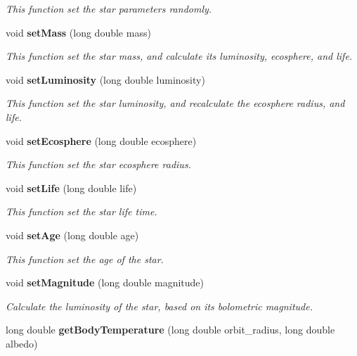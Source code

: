 \begin{CompactItemize}
\begin{CompactList}\small\item\em This function set the star parameters randomly. \item\end{CompactList}\item 
void {\bf set\-Mass} (long double mass)
\begin{CompactList}\small\item\em This function set the star mass, and calculate its luminosity, ecosphere, and life. \item\end{CompactList}\item 
void {\bf set\-Luminosity} (long double luminosity)
\begin{CompactList}\small\item\em This function set the star luminosity, and recalculate the ecosphere radius, and life. \item\end{CompactList}\item 
void {\bf set\-Ecosphere} (long double ecosphere)
\begin{CompactList}\small\item\em This function set the star ecosphere radius. \item\end{CompactList}\item 
void {\bf set\-Life} (long double life)
\begin{CompactList}\small\item\em This function set the star life time. \item\end{CompactList}\item 
void {\bf set\-Age} (long double age)
\begin{CompactList}\small\item\em This function set the age of the star. \item\end{CompactList}\item 
void {\bf set\-Magnitude} (long double magnitude)
\begin{CompactList}\small\item\em Calculate the luminosity of the star, based on its bolometric magnitude. \item\end{CompactList}\item 
long double {\bf get\-Body\-Temperature} (long double orbit\_\-radius, long double albedo)

\end{CompactItemize}
